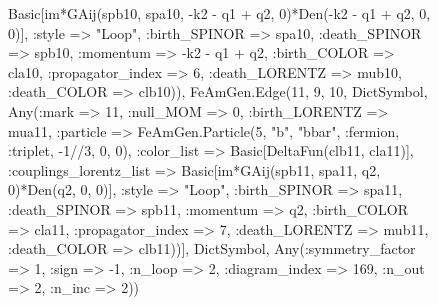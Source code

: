 \documentclass{revtex4}
\begin{document}
\begin{figure}[!htb]
\begin{center}
{Basic[im*GAij(spb10, spa10, -k2 - q1 + q2, 0)*Den(-k2 - q1 + q2, 0, 0)], :style => "Loop", :birth_SPINOR => spa10, :death_SPINOR => spb10, :momentum => -k2 - q1 + q2, :birth_COLOR => cla10, :propagator_index => 6, :death_LORENTZ => mub10, :death_COLOR => clb10)), FeAmGen.Edge(11, 9, 10, Dict{Symbol, Any}(:mark => 11, :null_MOM => 0, :birth_LORENTZ => mua11, :particle => FeAmGen.Particle(5, "b", "bbar", :fermion, :triplet, -1//3, 0, 0), :color_list => Basic[DeltaFun(clb11, cla11)], :couplings_lorentz_list => Basic[im*GAij(spb11, spa11, q2, 0)*Den(q2, 0, 0)], :style => "Loop", :birth_SPINOR => spa11, :death_SPINOR => spb11, :momentum => q2, :birth_COLOR => cla11, :propagator_index => 7, :death_LORENTZ => mub11, :death_COLOR => clb11))], Dict{Symbol, Any}(:symmetry_factor => 1, :sign => -1, :n_loop => 2, :diagram_index => 169, :n_out => 2, :n_inc => 2)) 
}
\end{center}
\end{figure}
\end{document}
